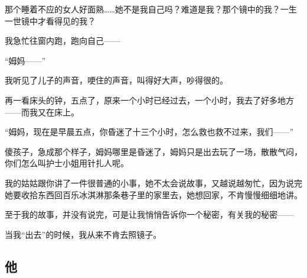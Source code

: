 \par 那个睡着不应的女人好面熟……她不是我自己吗？难道是我？那个镜中的我？一生一世镜中才看得见的我？
\par 我急忙往窗内跑，跑向自己——
\par “姆妈——”
\par 我听见了儿子的声音，哽住的声音，叫得好大声，吵得很的。
\par 再一看床头的钟，五点了，原来一个小时已经过去，一个小时，我去了好多地方——而我又在床上。
\par “姆妈，现在是早晨五点，你昏迷了十三个小时，怎么救也救不过来，我们——”
\par 傻孩子，急成那个样子，姆妈哪里是昏迷了，姆妈只是出去玩了一场，散散气闷，你们怎么叫护士小姐用针扎人呢。
\par 我的姑姑跟你讲了一件很普通的小事，她不太会说故事，又越说越匆忙，因为说完她要收拾东西回百乐冰淇淋那条巷子里的家里去，她想回家，不肯慢慢细细地讲。
\par 至于我的故事，并没有说完，可是让我悄悄告诉你一个秘密，有关我的秘密——
\par 当我“出去”的时候，我从来不肯去照镜子。



\subsection{他}

